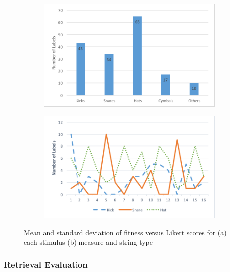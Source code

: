 \begin{figure}
\centering
\begin{subfigure}[b]{0.75\textwidth}
   \includegraphics[width=1\linewidth]{ch07_evaluation/figures/corpus_distribution.png}
   \caption{}
   \label{fig:distrub1} 
\end{subfigure}

\begin{subfigure}[b]{0.75\textwidth}
   \includegraphics[width=1\linewidth]{ch07_evaluation/figures/target_distribution.png}
   \caption{}
   \label{fig:distrub2}
\end{subfigure}

\caption[Two numerical solutions]{Mean and standard deviation of fitness versus Likert scores for (a) each stimulus (b) measure and string type }
\end{figure}

\subsubsection{Retrieval Evaluation}

